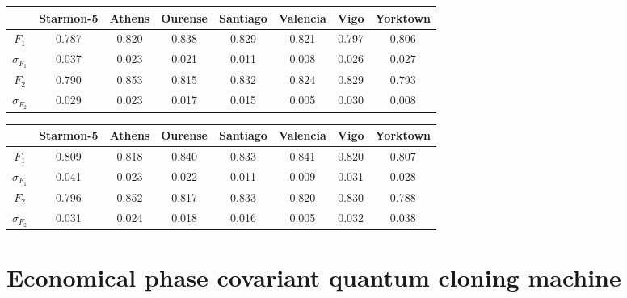 \begin{table}[H]
    \centering
    \begin{tabular}{|c|c|c|c|c|c|c|c|}
    \hline
    \textbf{} & \textbf{Starmon-5} & \textbf{Athens} & \textbf{Ourense} & \textbf{Santiago} & \textbf{Valencia} & \textbf{Vigo} & \textbf{Yorktown} \\ \hline
    $F_1$              & 0.787 & 0.820 & 0.838 & 0.829 & 0.821 & 0.797 & 0.806 \\ \hline
    $\sigma_{F_1}$     & 0.037 & 0.023 & 0.021 & 0.011 & 0.008 & 0.026 & 0.027 \\ \hline
    $F_2$              & 0.790 & 0.853 & 0.815 & 0.832 & 0.824 & 0.829 & 0.793 \\ \hline
    $\sigma_{F_2}$     & 0.029 & 0.023 & 0.017 & 0.015 & 0.005 & 0.030 & 0.008 \\ \hline
    \end{tabular}
\end{table}

\begin{table}[H]
    \centering
    \begin{tabular}{|c|c|c|c|c|c|c|c|}
    \hline
    \textbf{} & \textbf{Starmon-5} & \textbf{Athens} & \textbf{Ourense} & \textbf{Santiago} & \textbf{Valencia} & \textbf{Vigo} & \textbf{Yorktown} \\ \hline
    $F_1$              & 0.809 & 0.818 & 0.840 & 0.833 & 0.841 & 0.820 & 0.807 \\ \hline
    $\sigma_{F_1}$     & 0.041 & 0.023 & 0.022 & 0.011 & 0.009 & 0.031 & 0.028 \\ \hline
    $F_2$              & 0.796 & 0.852 & 0.817 & 0.833 & 0.820 & 0.830 & 0.788 \\ \hline
    $\sigma_{F_2}$     & 0.031 & 0.024 & 0.018 & 0.016 & 0.005 & 0.032 & 0.038 \\ \hline
    \end{tabular}
\end{table}
\section{Economical phase covariant quantum cloning machine}
